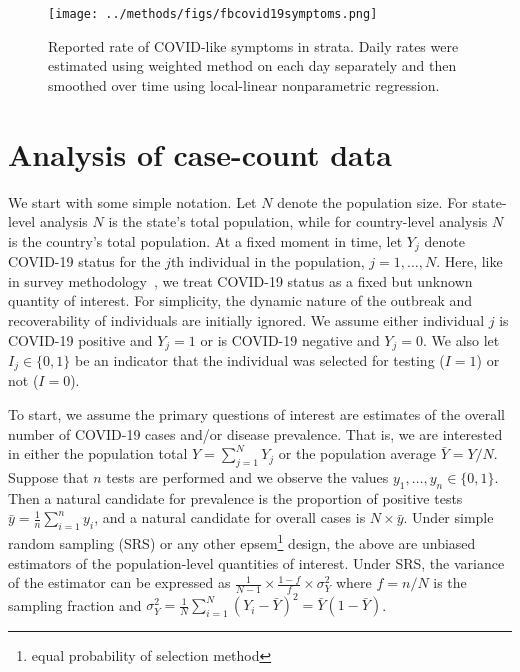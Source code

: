 \documentclass[12pt]{amsart}
\numberwithin{equation}{section}
\theoremstyle{plain}
\begin{document}
\begin{figure}[!th]
\centering
\texttt{[image: ../methods/figs/fbcovid19symptoms.png]}
\caption{Reported rate of COVID-like symptoms in strata.  Daily rates were estimated using weighted method on each day separately and then smoothed over time using local-linear nonparametric regression.}
\label{fig:fbsymptoms}
\vspace{-0.3cm}
\end{figure}


\section{Analysis of case-count data}
\label{section:casecount}

We start with some simple notation.  Let $N$ denote the population size.  For state-level analysis $N$ is the state's total population, while for country-level analysis $N$ is the country's total population.  At a fixed moment in time, let $Y_j$ denote COVID-19 status for the $j$th individual in the population, $j=1,\ldots, N$. Here, like in survey methodology~\citep{Cochran77}, we treat COVID-19 status as a fixed but unknown quantity of interest. For simplicity, the dynamic nature of the outbreak and recoverability of individuals are initially ignored.  We assume either individual $j$ is COVID-19 positive and $Y_j=1$ or is COVID-19 negative and $Y_j=0$. We also let $I_j \in \{0,1\}$ be an indicator that the individual was selected for testing ($I = 1$) or not ($I=0$).

To start, we assume the primary questions of interest are estimates of the overall number of COVID-19 cases and/or disease prevalence. That is, we are interested in either the population total $Y = \sum_{j=1}^N Y_j$ or the population average $\bar Y = Y/N$. Suppose that $n$ tests are performed and we observe the values $y_1, \ldots, y_n \in \{0,1\}$.  Then a natural candidate for prevalence is the proportion of positive tests $\bar y = \frac{1}{n} \sum_{i=1}^n y_i$, and a natural candidate for overall cases is $N \times \bar y$.
Under simple random sampling (SRS) or any other epsem\footnote{equal probability of selection method} design, the above are unbiased estimators of the population-level quantities of interest.  Under SRS, the variance of the estimator can be expressed as $\frac{1}{N-1} \times \frac{1-f}{f} \times \sigma_Y^2$ where $f = n/N$ is the sampling fraction and $\sigma_Y^2 = \frac{1}{N} \sum_{i=1}^N (Y_i - \bar Y)^2 = \bar Y (1- \bar Y)$.
\end{document}

